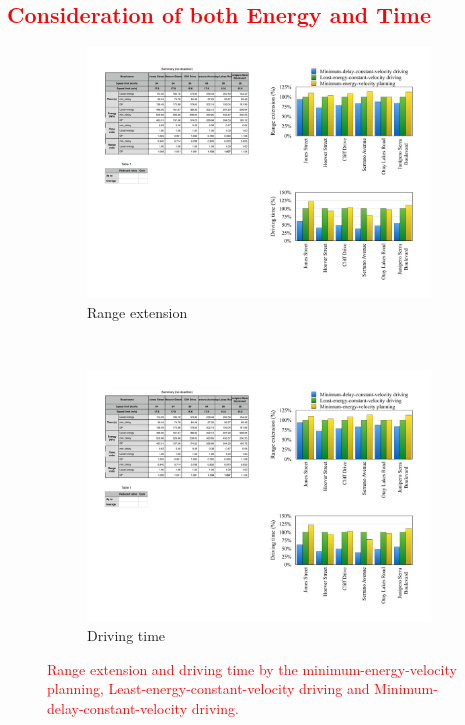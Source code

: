 \documentclass{IEEEtran}
\begin{document}
\textcolor{red}{\subsection{Consideration of both Energy and Time}} \label{subsec:energy_time}




\begin{figure}   %
\centering
	\begin{subfigure}{0.42\textwidth}
	\includegraphics[width=\hsize]{Figures/range_comp_bar.pdf}
	\caption{Range extension}
	\label{fig:range_comp}
	\end{subfigure}
~
	\begin{subfigure}{0.42\textwidth}
	\includegraphics[width=\hsize]{Figures/driving_time_comp_bar.pdf}
	\caption{Driving time}
	\label{fig:driving_time_comp}
	\end{subfigure}
\caption{\textcolor{red}{Range extension and driving time by the minimum-energy-velocity planning, Least-energy-constant-velocity driving and Minimum-delay-constant-velocity driving.}}
\label{fig:min_energy_planning_comp}
\end{figure}
\end{document}

